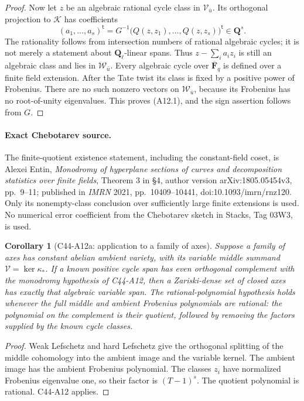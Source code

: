 \documentclass[11pt]{article}
\newtheorem{corollary}[theorem]{Corollary}
\theoremstyle{remark}\newtheorem{remark}[theorem]{Remark}
\begin{document}
\begin{proof}
Now let \(z\) be an algebraic rational cycle class in
\(\mathcal V_{\bar u}\). Its orthogonal projection to \(\mathcal K\)
has coefficients
\[
  (a_1,\ldots,a_s)^{\mathsf t}
       =G^{-1}\bigl(Q(z,z_1),\ldots,Q(z,z_s)\bigr)^{\mathsf t}
       \in\mathbf Q^s .                                  \tag{A12.2}
\]
The rationality follows from intersection numbers of rational
algebraic cycles; it is not merely a statement about
\(\mathbf Q_\ell\)-linear spans.
Thus \(z-\sum_i a_i z_i\) is still an algebraic class and lies
in \(\mathcal W_{\bar u}\).
Every algebraic cycle over \(\overline{\mathbf F}_q\) is defined
over a finite field extension. After the Tate twist its class
is fixed by a positive power of Frobenius.
There are no such nonzero vectors on \(\mathcal W_{\bar u}\),
because its Frobenius has no root-of-unity eigenvalues.
This proves (A12.1), and the sign assertion follows from \(G\).
\end{proof}

\paragraph{Exact Chebotarev source.}
The finite-quotient existence statement, including the constant-field
coset, is Alexei Entin, \emph{Monodromy of hyperplane sections of curves
and decomposition statistics over finite fields}, Theorem 3 in
\S4, author version arXiv:1805.05454v3, pp.~9--11;
published in \emph{IMRN} 2021, pp.~10409--10441,
doi:10.1093/imrn/rnz120.
Only its nonempty-class conclusion over sufficiently large finite
extensions is used. No numerical error coefficient from the
Chebotarev sketch in Stacks, Tag 03W3, is used.

\begin{corollary}[C44-A12a: application to a family of axes]
Suppose a family of axes has constant abelian ambient variety,
with its variable middle summand \(\mathcal V=\ker\kappa_*\).
If a known positive cycle span has even orthogonal complement
with the monodromy hypothesis of C44-A12, then a Zariski-dense
set of closed axes has exactly that algebraic variable span.
The rational-polynomial hypothesis holds whenever the full
middle and ambient Frobenius polynomials are rational:
the polynomial on the complement is their quotient, followed
by removing the factors supplied by the known cycle classes.
\end{corollary}

\begin{proof}
Weak Lefschetz and hard Lefschetz give the orthogonal splitting
of the middle cohomology into the ambient image and the variable
kernel. The ambient image has the ambient Frobenius polynomial.
The classes \(z_i\) have normalized Frobenius eigenvalue one,
so their factor is \((T-1)^s\).
The quotient polynomial is rational. C44-A12 applies.
\end{proof}
\end{document}
